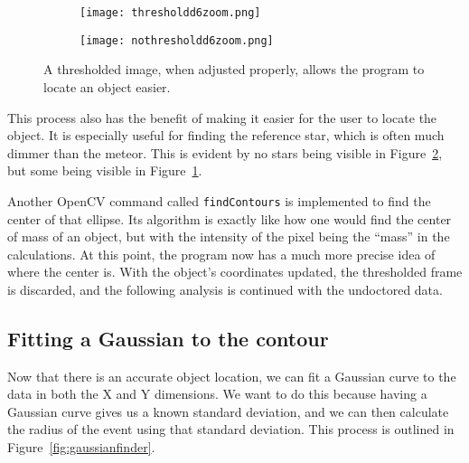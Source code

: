 \begin{figure}
\centering
\begin{subfigure}{.5\textwidth}
  \centering
  \texttt{[image: thresholdd6zoom.png]}
  \label{fig:nothresholdd6}
\end{subfigure}%
\begin{subfigure}{.5\textwidth}
  \centering
  \texttt{[image: nothresholdd6zoom.png]}
  \label{fig:thresholdd6}
\end{subfigure}
\caption{A thresholded image, when adjusted properly, allows the program to locate an object easier.}
\label{fig:ThresholdComparison}
\end{figure}



This process also has the benefit of making it easier for the user to locate the object. It is especially useful for finding the reference star, which is often much dimmer than the meteor. This is evident by no stars being visible in Figure~\ref{fig:thresholdd6}, but some being visible in Figure~\ref{fig:nothresholdd6}.

Another OpenCV command called \texttt{findContours} is implemented to find the center of that ellipse. Its algorithm is exactly like how one would find the center of mass of an object, but with the intensity of the pixel being the ``mass'' in the calculations. At this point, the program now has a much more precise idea of where the center is. With the object's coordinates updated, the thresholded frame is discarded, and the following analysis is continued with the undoctored data. 


\subsection{Fitting a Gaussian to the contour}
Now that there is an accurate object location, we can fit a Gaussian curve to the data in both the X and Y dimensions. We want to do this because having a Gaussian curve gives us a known standard deviation, and we can then calculate the radius of the event using that standard deviation. This process is outlined in Figure~\ref{fig:gaussianfinder}.

